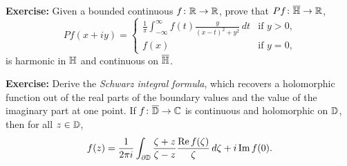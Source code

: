 \documentclass[10pt,aspectratio=169]{beamer}
\begin{document}
\begin{frame}
\textbf{Exercise:}
Given a bounded continuous $f \colon {\mathbb{R}} \to {\mathbb{R}}$, prove that 
$Pf \colon \overline{{\mathbb{H}}} \to {\mathbb{R}}$,
\begin{equation*}
Pf(x+iy)
=
\begin{cases}
\frac{1}{\pi}
\int_{-\infty}^{\infty} f(t) \frac{y}{{(x-t)}^2+y^2} \, dt
&
\text{if $y > 0$,} \\
f(x) & \text{if $y=0$,}
\end{cases}
\end{equation*}
is harmonic in ${\mathbb{H}}$ and continuous on $\overline{{\mathbb{H}}}$.

\medskip
\pause

\textbf{Exercise:}
Derive the \emph{Schwarz integral formula}, which recovers
a holomorphic function out of the real parts of the boundary values
and the value of the imaginary part at one point.
If $f \colon \overline{{\mathbb{D}}} \to {\mathbb{C}}$ is continuous and holomorphic on
${\mathbb{D}}$, then for all $z \in {\mathbb{D}}$,
\begin{equation*}
f(z) =
\frac{1}{2\pi i}
\int_{\partial {\mathbb{D}}}
\frac{\zeta+z}{\zeta-z} \frac{\operatorname{Re} f(\zeta)}{\zeta} \, d\zeta
+ i \operatorname{Im} f(0) .
\end{equation*}


\end{frame}
\end{document}
